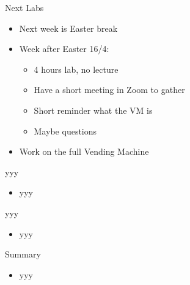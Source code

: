 \begin{frame}[fragile]{Next Labs}
\begin{itemize}
\item Next week is Easter break
\item Week after Easter 16/4:
\begin{itemize}
\item 4 hours lab, no lecture
\item Have a short meeting in Zoom to gather
\item Short reminder what the VM is
\item Maybe questions
\end{itemize}
\item Work on the full Vending Machine
\end{itemize}
\end{frame}


\begin{frame}[fragile]{yyy}
\begin{itemize}
\item yyy
\end{itemize}
\end{frame}

\begin{frame}[fragile]{yyy}
\begin{itemize}
\item yyy
\end{itemize}
\end{frame}


\begin{frame}[fragile]{Summary}
\begin{itemize}
\item yyy
\end{itemize}
\end{frame}





